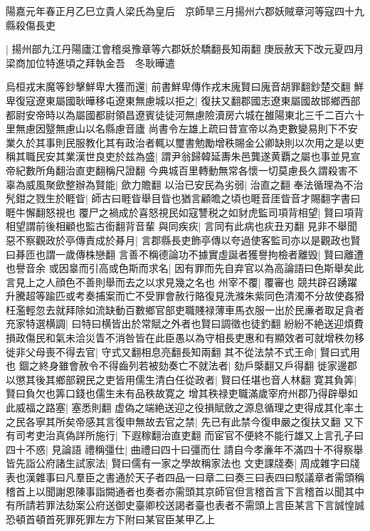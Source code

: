 陽嘉元年春正月乙巳立貴人梁氏為皇后　京師旱三月揚州六郡妖賊章河等寇四十九縣殺傷長吏

|{
	揚州部九江丹陽廬江會稽吳豫章等六郡妖於驕翻長知兩翻}
庚辰赦天下改元夏四月梁商加位特進頃之拜執金吾　冬耿曄遣

烏桓戎末魔等鈔擊鮮卑大獲而還|{
	前書鮮卑傳作戎末廆賢曰廆音胡罪翻鈔楚交翻}
鮮卑復寇遼東屬國耿曄移屯遼東無慮城以拒之|{
	復扶又翻郡國志遼東屬國故邯鄉西部都尉安帝時以為屬國都尉領昌遼賓徒徒河無慮險瀆房六城在雒陽東北三千二百六十里無慮因毉無慮山以名縣慮音廬}
尚書令左雄上疏曰昔宣帝以為吏數變易則下不安業久於其事則民服教化其有政治者輒以璽書勉勵增秩賜金公卿缺則以次用之是以吏稱其職民安其業漢世良吏於兹為盛|{
	謂尹翁歸韓延夀朱邑龔遂黄覇之屬也事並見宣帝紀數所角翻治直吏翻稱尺證翻}
今典城百里轉動無常各懷一切莫慮長久謂殺害不辜為威風聚歛整辦為賢能|{
	歛力贍翻}
以治已安民為劣弱|{
	治直之翻}
奉法循理為不治髠鉗之戮生於睚眥|{
	師古曰睚眥舉目眥也猶言顧曕之頃也睚音厓眥音才賜翻字書曰睚牛懈翻怒視也}
覆尸之禍成於喜怒視民如寇讐税之如豺虎監司項背相望|{
	賢曰項背相望謂前後相顧也監古銜翻背音輩}
與同疾疢|{
	言同有此病也疢丑刃翻}
見非不舉聞惡不察觀政於亭傳責成於朞月|{
	言郡縣長吏飾亭傳以夸過使客監司亦以是觀政也賢曰朞匝也謂一歲傳株戀翻}
言善不稱德論功不據實虛誕者獲譽拘檢者離毁|{
	賢曰離遭也譽音余}
或因辠而引高或色斯而求名|{
	因有罪而先自弃官以為高論語曰色斯舉矣此言見上之人顔色不善則舉而去之以求見幾之名也}
州宰不覆|{
	覆審也}
競共辟召踴躍升騰超等踰匹或考奏捕案而亡不受罪會赦行賂復見洗滌朱紫同色清濁不分故使姦猾枉濫輕忽去就拜除如流缺動百數鄉官部吏職賤禄薄車馬衣服一出於民亷者取足貪者充家特選横調|{
	曰特曰横皆出於常賦之外者也賢曰調徵也徒釣翻}
紛紛不絶送迎煩費損政傷民和氣未洽災眚不消咎皆在此臣愚以為守相長吏惠和有顯效者可就增秩勿移徙非父母喪不得去官|{
	守式又翻相息亮翻長知兩翻}
其不從法禁不式王命|{
	賢曰式用也}
錮之終身雖會赦令不得齒列若被劾奏亡不就法者|{
	劾戶㮣翻又戶得翻}
徙家邊郡以懲其後其鄉部親民之吏皆用儒生清白任從政者|{
	賢曰任堪也音人林翻}
寛其負筭|{
	賢曰負欠也筭口錢也儒生未有品秩故寛之}
增其秩禄吏職滿歲宰府州郡乃得辟舉如此威福之路塞|{
	塞悉則翻}
虚偽之端絶送迎之役損賦斂之源息循理之吏得成其化率土之民各寧其所矣帝感其言復申無故去官之禁|{
	先已有此禁今復申嚴之復扶又翻}
又下有司考吏治真偽詳所施行|{
	下遐稼翻治直吏翻}
而宦官不便終不能行雄又上言孔子曰四十不惑|{
	見論語}
禮稱彊仕|{
	曲禮曰四十曰彊而仕}
請自今孝亷年不滿四十不得察舉皆先詣公府諸生試家法|{
	賢曰儒有一家之學故稱家法也}
文吏課牋奏|{
	周成雜字曰牋表也漢雜事曰凡羣臣之書通於天子者四品一曰章二曰奏三曰表四曰駁議章者需頭稱稽首上以聞謝恩陳事詣闕通者也奏者亦需頭其京師官但言稽首言下言稽首以聞其中有所請若罪法劾案公府送御史臺卿校送謁者臺也表者不需頭上言臣某言下言誠惶誠恐頓首頓首死罪死罪左方下附曰某官臣某甲乙上}
